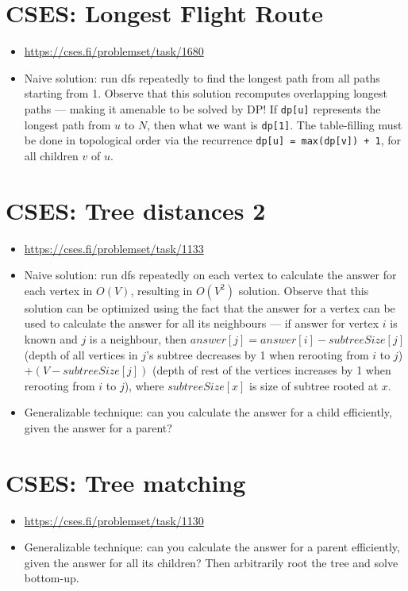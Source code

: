 \documentclass[titlepage, 12pt]{book}
\begin{document}
\section{CSES: Longest Flight Route}
\begin{itemize}
  \item \url{https://cses.fi/problemset/task/1680}
  \item Naive solution: run dfs repeatedly to find the longest path from all
    paths starting from 1. Observe that this solution recomputes overlapping
    longest paths --- making it amenable to be solved by DP! If \verb|dp[u]|
    represents the longest path from $u$ to $N$, then what we want is
    \verb|dp[1]|. The table-filling must be done in topological order via the
    recurrence \verb|dp[u] = max(dp[v]) + 1|, for all children $v$ of $u$.
\end{itemize}

\section{CSES: Tree distances 2}
\begin{itemize}
  \item \url{https://cses.fi/problemset/task/1133}
  \item Naive solution: run dfs repeatedly on each vertex to calculate the
    answer for each vertex in $O(V)$, resulting in $O(V^2)$ solution. Observe
    that this solution can be optimized using the fact that the answer for a
    vertex can be used to calculate the answer for all its neighbours --- if
    answer for vertex $i$ is known and $j$ is a neighbour, then $answer[j] =
    answer[i] - subtreeSize[j]$ (depth of all vertices in $j$'s subtree
    decreases by 1 when rerooting from $i$ to $j$) $+ (V - subtreeSize[j])$
    (depth of rest of the vertices increases by 1 when rerooting from $i$ to
    $j$), where $subtreeSize[x]$ is size of subtree rooted at $x$.
  \item Generalizable technique: can you calculate the answer for a child
    efficiently, given the answer for a parent?
\end{itemize}

\section{CSES: Tree matching}
\begin{itemize}
  \item \url{https://cses.fi/problemset/task/1130}
  \item Generalizable technique: can you calculate the answer for a parent
    efficiently, given the answer for all its children? Then arbitrarily root
    the tree and solve bottom-up.
\end{itemize}
\end{document}
